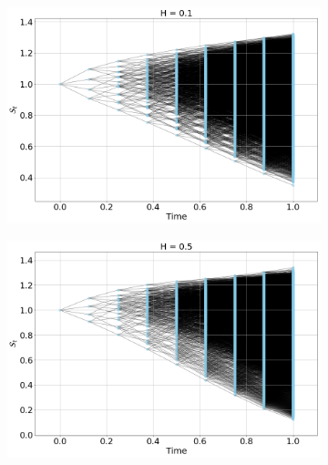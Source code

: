 \documentclass[12pt]{article}
\numberwithin{equation}{section}
\begin{document}
\begin{figure}[htb!]
\begin{center}
  \begin{subfigure}{0.5\textwidth}
    \centering
    \includegraphics[width=1.0\textwidth]{price_tree_H01}
    \label{fig:1}
  \end{subfigure}%
  \begin{subfigure}{0.5\textwidth}
    \centering
    \includegraphics[width=1.0\textwidth]{price_tree_H05}
    \label{fig:2}
  \end{subfigure}\\
  

\end{center}
\end{figure}
\end{document}
